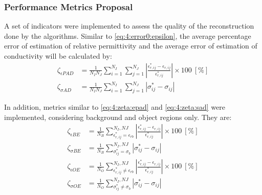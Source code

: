 			\subsubsection{Performance Metrics Proposal}\label{chap:investigation:proposal:performance:metrics}
				
				A set of indicators were implemented to assess the quality of the reconstruction done by the algorithms. Similar to \eqref{eq:4:error0:epsilon}, the average percentage error of estimation of relative permittivity and the average error of estimation of conductivity will be calculated by:
				\begin{align}
					\zeta_{\epsilon PAD} &= \frac{1}{N_IN_J}\sum\limits_{i=1}^{N_I}\sum\limits_{j=1}^{N_J}\left|\frac{\epsilon^*_{r,ij}-\epsilon_{r,ij}}{\epsilon^*_{r,ij}}\right|\times100~[\%] \label{eq:4:zeta:epad} \\
					\zeta_{\sigma AD} &= \frac{1}{N_IN_J}\sum\limits_{i=1}^{N_I}\sum\limits_{j=1}^{N_J}\left|\sigma^*_{ij}-\sigma_{ij}\right| \label{eq:4:zeta:sad}
				\end{align}
				
				In addition, metrics similar to \eqref{eq:4:zeta:epad} and \eqref{eq:4:zeta:sad} were implemented, considering background and object regions only. They are:
				\begin{align}
					\zeta_{\epsilon BE} &= \frac{1}{N_B}\sum\limits_{\epsilon^*_{r,ij}=\epsilon_{rb}}^{N_I,NJ}\left|\frac{\epsilon^*_{r,ij}-\epsilon_{r,ij}}{\epsilon^*_{r,ij}}\right|\times100~[\%] \label{eq:4:zeta:ebe} \\
					\zeta_{\sigma BE} &= \frac{1}{N_B}\sum\limits_{\sigma^*_{ij}=\sigma_{b}}^{N_I,NJ}\left|\sigma^*_{ij}-\sigma_{ij}\right| \label{eq:4:zeta:sbe} \\
					\zeta_{\epsilon OE} &= \frac{1}{N_O}\sum\limits_{\epsilon^*_{r,ij}\neq\epsilon_{rb}}^{N_I,NJ}\left|\frac{\epsilon^*_{r,ij}-\epsilon_{r,ij}}{\epsilon^*_{r,ij}}\right|\times100~[\%] \label{eq:4:zeta:eoe} \\
					\zeta_{\sigma OE} &= \frac{1}{N_O}\sum\limits_{\sigma^*_{ij}\neq\sigma_{b}}^{N_I,NJ}\left|\sigma^*_{ij}-\sigma_{ij}\right| \label{eq:4:zeta:soe}
				\end{align}
				
